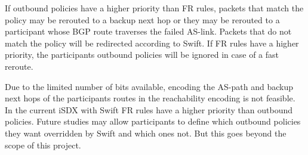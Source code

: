 If outbound policies have a higher priority than FR rules, packets that match the policy may be rerouted to a backup next hop or they may be rerouted to a participant whose BGP route traverses the failed AS-link. Packets that do not match the policy will be redirected according to Swift. If FR rules have a higher priority, the participants outbound policies will be ignored in case of a fast reroute.

Due to the limited number of bits available, encoding the AS-path and backup next hops of the participants routes in the reachability encoding is not feasible. In the current iSDX with Swift FR rules have a higher priority than outbound policies. Future studies may allow participants to define which outbound policies they want overridden by Swift and which ones not. But this goes beyond the scope of this project.

